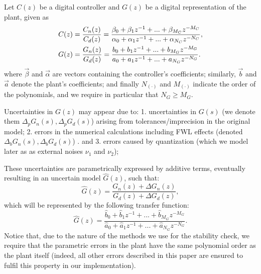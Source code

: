 \documentclass[final]{sig-alternate-05-2015}
\newcommand{\aabatecmt}[1]{}%
\newcommand{\blue}[1]{{\color{blue}#1}}
\newcommand{\red}[1]{{\color{red}#1}}
\begin{document}
Let $C(z)$ be a digital controller and $G(z)$ be a digital representation of the plant, 
given as
%
\begin{align}
\small
\label{controller_plant_tf}
C(z)&=\frac{C_n(z)}{C_d(z)}=\frac{\beta_{0}+\beta_{1}z^{-1}+...+\beta_{M_C}z^{-M_C}}{\alpha_{0}+\alpha_{1}z^{-1}+...+\alpha_{N_C}z^{-N_C}}, \\
G(z)&=\frac{G_n(z)}{G_d(z)}=\frac{b_{0}+b_{1}z^{-1}+...+b_{M_G}z^{-M_G}}{a_{0}+a_{1}z^{-1}+...+a_{N_G}z^{-N_G}}.
\end{align}
%
where $\vec{\beta}$ and $\vec{\alpha}$ are vectors containing the
controller's coefficients; similarly, $\vec{b}$ and $\vec{a}$ denote the
plant's coefficients; 
and finally $N_{(\cdot)}$ and $M_{(\cdot)}$ indicate the order of the polynomials,  
and we require in particular that $N_G \geq M_G$. 

Uncertainties in $G(z)$ may appear due to: 
1. uncertainties in $G(s)$ (we denote them $\Delta_p{G}_n(s),\Delta_p{G}_d(s)$) arising from tolerances/imprecision in the original model; 
2. errors in the numerical calculations including FWL effects (denoted $\Delta_b{G}_n(s),\Delta_b{G}_d(s)$)
\aabatecmt{[these are related to FWL - we introduce them as such, but then use other operators in equation 10 - very confusing]}.  
and 
3. errors caused by quantization (which we model later as as external noises $\nu_1$ and $\nu_2$);
\aabatecmt{[no, these are the quantisation ones!]}
These uncertainties are parametrically expressed by additive terms, eventually resulting in an uncertain model $\hat{G}(z)$, such that:
%
\begin{equation}
\hat{G}(z)=\frac{G_n(z)+\Delta G_n(z)}{G_d(z)+\Delta G_d(z)},
\end{equation}
%
which will be represented by the following transfer function:
%
\begin{equation}
\hat{G}(z)=\frac{\hat{b}_{0}+\hat{b}_{1}z^{-1}+...+\hat{b}_{M_G}z^{-M_G}}{\hat{a}_{0}+\hat{a}_{1}z^{-1}+...+\hat{a}_{N_G}z^{-N_G}}. 
\end{equation}
%
Notice that, due to the nature of the methods we use for the stability check, we require
that the parametric errors in the plant have the same polynomial order as
the plant itself (\blue{indeed, all other errors described in this paper are ensured to
fulfil this property in our implementation}). 
\end{document}
